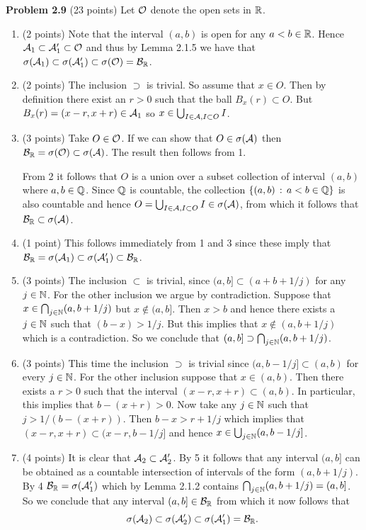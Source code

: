 \textbf{Problem 2.9} (23 points)
Let $\mathcal O$ denote the open sets in $\mathbb R$.
\begin{enumerate}
\item (2 points) Note that the interval $(a,b)$ is open for any $a < b \in \mathbb R$. Hence $\mathcal A_1 \subset \mathcal A_1^\prime \subset \mathcal O$ and thus by Lemma 2.1.5 we have that $\sigma(\mathcal A_1) \subset \sigma(\mathcal A_1^\prime) \subset \sigma(\mathcal O) = \mathcal B_{\mathbb R}$.
\item (2 points) The inclusion $\supset$ is trivial. So assume that $x \in O$. Then by definition there exist an $r > 0$ such that the ball $B_x(r) \subset O$. But $B_x(r) = (x-r, x+r) \in \mathcal A_1$ so $x \in \bigcup_{I \in \mathcal A, I \subset O} I$.
\item (3 points) Take $O \in \mathcal O$. If we can show that $O \in \sigma(\mathcal A)$ then $\mathcal B_{\mathbb R} = \sigma(\mathcal O) \subset \sigma(\mathcal A)$. The result then follows from 1. 

From 2 it follows that $O$ is a union over a subset collection of interval $(a,b)$ where $a,b \in \mathbb Q$. Since $\mathbb Q$ is countable, the collection $\{(a,b) \, : \, a < b \in \mathbb Q\}$ is also countable and hence $O = \bigcup_{I \in \mathcal A, I \subset O} I \in \sigma(\mathcal A)$, from which it follows that $\mathcal B_{\mathbb R} \subset \sigma(\mathcal A)$.
\item (1 point) This follows immediately from 1 and 3 since these imply that $\mathcal B_{\mathbb R} = \sigma(\mathcal A_1) \subset \sigma(\mathcal A_1^\prime) \subset \mathcal B_{\mathbb R}$.
\item (3 points) The inclusion $\subset$ is trivial, since $(a,b] \subset (a + b +1/j)$ for any $j \in \mathbb N$. For the other inclusion we argue by contradiction. Suppose that $x \in \bigcap_{j \in \mathbb N} (a,b+1/j)$ but $x \notin (a,b]$. Then $x > b$ and hence there exists a $j \in \mathbb N$ such that $(b-x) > 1/j$. But this implies that $x \notin (a,b+1/j)$ which is a contradiction. So we conclude that $(a,b] \supset \bigcap_{j \in \mathbb N} (a,b+1/j)$.
\item (3 points) This time the inclusion $\supset$ is trivial since $(a,b-1/j] \subset (a,b)$ for every $j \in \mathbb N$. For the other inclusion suppose that $x \in (a,b)$. Then there exists a $r > 0$ such that the interval $(x-r,x+r) \subset (a,b)$. In particular, this implies that $b - (x+r) > 0$. Now take any $j \in \mathbb N$ such that $j >1/(b - (x+r))$. Then $b - x > r + 1/j$ which implies that $(x-r,x+r) \subset (x-r,b-1/j]$ and hence $x \in \bigcup_{j \in \mathbb N} (a,b-1/j]$.
\item (4 points) It is clear that $\mathcal A_2 \subset \mathcal A_2^\prime$. By 5 it follows that any interval $(a,b]$ can be obtained as a countable intersection of intervals of the form $(a,b+1/j)$. By 4 $\mathcal B_{\mathbb R} = \sigma(\mathcal A_1^\prime)$ which by Lemma 2.1.2 contains $\bigcap_{j \in \mathbb N} (a,b+1/j) = (a,b]$. So we conclude that any interval $(a,b] \in \mathcal B_{\mathbb R}$ from which it now follows that
\[
	\sigma(\mathcal A_2) \subset \sigma(\mathcal A_2^\prime) \subset \sigma(\mathcal A_1^\prime) = \mathcal B_{\mathbb R}.
\]


\end{enumerate}
